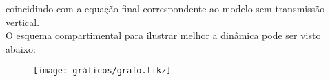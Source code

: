 \documentclass{article}
\begin{document}
coincidindo com a equação final correspondente ao modelo sem transmissão vertical.\\
\noindent O esquema compartimental para ilustrar melhor a dinâmica pode ser visto abaixo:

\begin{figure}[!ht]
\centering
\texttt{[image: gráficos/grafo.tikz]}
\end{figure}
\newpage
   
\end{document}
